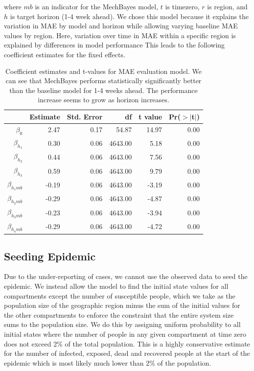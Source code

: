 \documentclass[11pt]{amsart}
\begin{document}
where $mb$ is an indicator for the MechBayes model, $t$ is timezero, $r$ is region, and $h$ is target horizon (1-4 week ahead). We chose this model because it explains the variation in MAE by model and horizon while allowing varying baseline MAE values by region. Here, variation over time in MAE within a specific region is explained by differences in model performance This leads to the following coefficient estimates for the fixed effects.

\begin{table}[ht]
\centering
\begin{tabular}{rrrrrr}
  \hline
 & Estimate & Std. Error & df & t value & Pr($>$$|$t$|$) \\ 
  \hline
$\beta_0$  & 2.47 & 0.17 & 54.87 & 14.97 & 0.00 \\ 
   $\beta_{h_1}$ & 0.30 & 0.06 & 4643.00 & 5.18 & 0.00 \\ 
 $\beta_{h_2} $ & 0.44 & 0.06 & 4643.00 & 7.56 & 0.00 \\ 
  $\beta_{h_3}$ & 0.59 & 0.06 & 4643.00 & 9.79 & 0.00 \\ 
  $\beta_{h_1 mb}$  & -0.19 & 0.06 & 4643.00 & -3.19 & 0.00 \\ 
  $\beta_{h_2 mb}$ & -0.29 & 0.06 & 4643.00 & -4.87 & 0.00 \\ 
   $\beta_{h_3mb}$ & -0.23 & 0.06 & 4643.00 & -3.94 & 0.00 \\ 
 $\beta_{h_4mb}$ & -0.29 & 0.06 & 4643.00 & -4.72 & 0.00 \\ 
   \hline
\end{tabular}
\caption{Coefficient estimates and t-values for MAE evaluation model. We can see that MechBayes performs statistically significantly better than the baseline model for 1-4 weeks ahead. The performance increase seems to grow as horizon increases.}
\end{table}


\subsection{Seeding Epidemic}
Due to the under-reporting of cases, we cannot use the observed data to seed the epidemic. We instead allow the model to find the initial state values for all compartments except the number of susceptible people, which we take as the population size of the geographic region minus the sum of the initial values for the other compartments to enforce the constraint that the entire system size sums to the population size. We do this by assigning uniform probability to all initial states where the number of people in any given compartment at time zero does not exceed 2\% of the total population. This is a highly conservative estimate for the number of infected, exposed, dead and recovered people at the start of the epidemic which is most likely much lower than 2\% of the population. 
\end{document}
